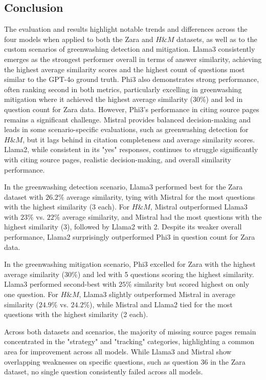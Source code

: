\documentclass[]{article}
\begin{document}
\subsection{Conclusion}
The evaluation and results highlight notable trends and differences across the four models when applied to both the Zara and $H\&M$ datasets, 
as well as to the custom scenarios of greenwashing detection and mitigation.
Llama3 consistently emerges as the strongest performer overall in terms of answer similarity, 
achieving the highest average similarity scores and the highest count of questions most similar to the GPT-4o ground truth. 
Phi3 also demonstrates strong performance, often ranking second in both metrics, particularly excelling in greenwashing mitigation where it achieved the highest average similarity ($30\%$) and led in question count for Zara data. 
However, Phi3’s performance in citing source pages remains a significant challenge. Mistral provides balanced decision-making and leads in some scenario-specific evaluations, 
such as greenwashing detection for $H\&M$, but it lags behind in citation completeness and average similarity scores. Llama2, while consistent in its "yes" responses, continues to struggle significantly with citing source pages, realistic decision-making, and overall similarity performance.

In the greenwashing detection scenario, Llama3 performed best for the Zara dataset with $26.2\%$ average similarity, tying with Mistral for the most questions with the highest similarity (3 each). For $H\&M$, Mistral outperformed Llama3 with $23\%$ vs. $22\%$ average similarity, 
and Mistral had the most questions with the highest similarity (3), followed by Llama2 with 2. Despite its weaker overall performance, Llama2 surprisingly outperformed Phi3 in question count for Zara data.

In the greenwashing mitigation scenario, Phi3 excelled for Zara with the highest average similarity ($30\%$) and led with 5 questions scoring the highest similarity. Llama3 performed second-best with $25\%$ similarity but scored highest on only one question. 
For $H\&M$, Llama3 slightly outperformed Mistral in average similarity ($24.9\%$ vs. $24.2\%$), while Mistral and Llama2 tied for the most questions with the highest similarity (2 each).

Across both datasets and scenarios, the majority of missing source pages remain concentrated in the "strategy" and "tracking" categories, highlighting a common area for improvement across all models. 
While Llama3 and Mistral show overlapping weaknesses on specific questions, such as question 36 in the Zara dataset, no single question consistently failed across all models.
\end{document}

